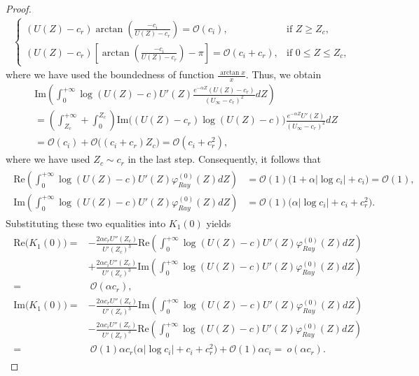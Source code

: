 \documentclass[reqno,11pt]{amsart}
\numberwithin{equation}{section}
\numberwithin{equation}{section}
\theoremstyle{plain}
\begin{document}
\begin{proof}
\begin{align*}
\begin{cases}
					(U(Z)-c_r)\arctan\left(\frac{-c_i}{U(Z)-c_r}\right)=\mathcal{O}(c_i), & \mbox{if } Z\geq Z_c, \\
					(U(Z)-c_r)\left[\arctan\left(\frac{-c_i}{U(Z)-c_r}\right)-\pi\right]=\mathcal{O}(c_i+c_r), & \mbox{if~} 0\leq Z\leq Z_c,
				\end{cases} 
			\end{align*}
			where we have used the boundedness of function $\displaystyle \frac{\arctan x}{x}$. Thus, we obtain
			\begin{align*}
				&\text{Im}\left(\int_{0}^{+\infty}\log(U(Z)-c) U'(Z)\frac{e^{-\alpha Z}(U(Z)-c_r)}{(U_\infty-c_r)^2}dZ\right)\\
				& =\left(\int_{Z_c}^{+\infty}+\int_{0}^{Z_c}\right)\text{Im}\Big((U(Z)-c_r)\log(U(Z)-c) \Big)\frac{e^{-\alpha Z}U'(Z)}{(U_\infty-c_r)^2}dZ\\
				&=\mathcal{O}(c_i)+\mathcal{O}\big((c_i+c_r)Z_c\big)=\mathcal{O}(c_i+c_r^2),
			\end{align*}
			where we have used $Z_c\sim c_r$ in the last step. Consequently, it follows that
			\begin{align}\begin{aligned}
					\text{Re}\left(\int_{0}^{+\infty}\log(U(Z)-c) U'(Z)\varphi_{Ray}^{(0)}(Z)dZ\right) & =\mathcal{O}(1)\big(1+\alpha|\log c_i|+c_i\big)=\mathcal{O}(1), \\
					\text{Im}\left(\int_{0}^{+\infty}\log(U(Z)-c) U'(Z)\varphi_{Ray}^{(0)}(Z)dZ\right) & =\mathcal{O}(1)\big(\alpha|\log c_i|+c_i+c_r^2\big).\nonumber
			\end{aligned}\end{align}
Substituting these two equalities into $K_1(0)$ yields
			\begin{align}\label{K1-0-im}\begin{aligned}
					\text{Re}\big(K_1(0)\big) =& -\frac{2\alpha c_r U''(Z_c)}{U'(Z_c)^3} \text{Re}\left(\int_{0}^{+\infty}\log(U(Z)-c) U'(Z)\varphi_{Ray}^{(0)}(Z)dZ\right)\\
					&+\frac{2\alpha c_i U''(Z_c)}{U'(Z_c)^3} \text{Im}\left(\int_{0}^{+\infty}\log(U(Z)-c) U'(Z)\varphi_{Ray}^{(0)}(Z)dZ\right)\\
					= &~ \mathcal{O}(\alpha c_r),\\
					\text{Im}\big(K_1(0)\big) =& -\frac{2\alpha c_r U''(Z_c)}{U'(Z_c)^3} \text{Im}\left(\int_{0}^{+\infty}\log(U(Z)-c) U'(Z)\varphi_{Ray}^{(0)}(Z)dZ\right)\\
					&-\frac{2\alpha c_iU''(Z_c)}{U'(Z_c)^3} \text{Re}\left(\int_{0}^{+\infty}\log(U(Z)-c) U'(Z)\varphi_{Ray}^{(0)}(Z)dZ\right)\\
					= &~ \mathcal{O}(1)\alpha c_r\big(\alpha|\log c_i|+c_i+c_r^2\big)+\mathcal{O}(1)\alpha c_i=~o(\alpha c_r).
			\end{aligned}\end{align}
		

\end{proof}
\end{document}
